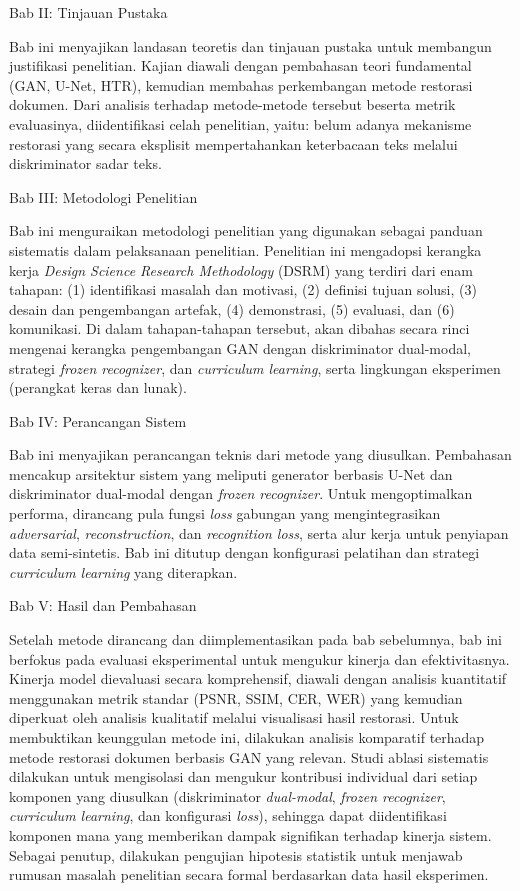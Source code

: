 \documentclass[12pt,a4paper]{article}
\begin{document}
Bab II: Tinjauan Pustaka

Bab ini menyajikan landasan teoretis dan tinjauan pustaka untuk membangun justifikasi penelitian. Kajian diawali dengan pembahasan teori fundamental (GAN, U-Net, HTR), kemudian membahas perkembangan metode restorasi dokumen. Dari analisis terhadap metode-metode tersebut beserta metrik evaluasinya, diidentifikasi celah penelitian, yaitu: belum adanya mekanisme restorasi yang secara eksplisit mempertahankan keterbacaan teks melalui diskriminator sadar teks.


Bab III: Metodologi Penelitian

Bab ini menguraikan metodologi penelitian yang digunakan sebagai panduan sistematis dalam pelaksanaan penelitian. Penelitian ini mengadopsi kerangka kerja \textit{Design Science Research Methodology} (DSRM) yang terdiri dari enam tahapan: (1) identifikasi masalah dan motivasi, (2) definisi tujuan solusi, (3) desain dan pengembangan artefak, (4) demonstrasi, (5) evaluasi, dan (6) komunikasi. Di dalam tahapan-tahapan tersebut, akan dibahas secara rinci mengenai kerangka pengembangan GAN dengan diskriminator dual-modal, strategi \textit{frozen recognizer}, dan \textit{curriculum learning}, serta lingkungan eksperimen (perangkat keras dan lunak).


Bab IV: Perancangan Sistem

Bab ini menyajikan perancangan teknis dari metode yang diusulkan. Pembahasan mencakup arsitektur sistem yang meliputi generator berbasis U-Net dan diskriminator dual-modal dengan \textit{frozen recognizer}. Untuk mengoptimalkan performa, dirancang pula fungsi \textit{loss} gabungan yang mengintegrasikan \textit{adversarial}, \textit{reconstruction}, dan \textit{recognition loss}, serta alur kerja untuk penyiapan data semi-sintetis. Bab ini ditutup dengan konfigurasi pelatihan dan strategi \textit{curriculum learning} yang diterapkan.


Bab V: Hasil dan Pembahasan

Setelah metode dirancang dan diimplementasikan pada bab sebelumnya, bab ini berfokus pada evaluasi eksperimental untuk mengukur kinerja dan efektivitasnya. Kinerja model dievaluasi secara komprehensif, diawali dengan analisis kuantitatif menggunakan metrik standar (PSNR, SSIM, CER, WER) yang kemudian diperkuat oleh analisis kualitatif melalui visualisasi hasil restorasi. Untuk membuktikan keunggulan metode ini, dilakukan analisis komparatif terhadap metode restorasi dokumen berbasis GAN yang relevan. Studi ablasi sistematis dilakukan untuk mengisolasi dan mengukur kontribusi individual dari setiap komponen yang diusulkan (diskriminator \textit{dual-modal}, \textit{frozen recognizer}, \textit{curriculum learning}, dan konfigurasi \textit{loss}), sehingga dapat diidentifikasi komponen mana yang memberikan dampak signifikan terhadap kinerja sistem. Sebagai penutup, dilakukan pengujian hipotesis statistik untuk menjawab rumusan masalah penelitian secara formal berdasarkan data hasil eksperimen.
\end{document}
